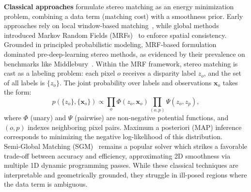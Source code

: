 \noindent\textbf{Classical approaches} formulate stereo matching as an energy minimization problem, combining a data term (matching cost) with a smoothness prior.
Early approaches rely on local window-based matching~\cite{scharstein2002taxonomy}, while global methods introduced Markov Random Fields (MRFs)~\cite{szeliski2008comparative} to enforce spatial consistency.
Grounded in principled probabilistic modeling, MRF-based formulation dominated pre-deep-learning stereo methods, as evidenced by their prevalence on benchmarks like Middlebury~\cite{scharstein2002taxonomy}.
Within the MRF framework, stereo matching is cast as a labeling problem: each pixel $o$ receives a disparity label $z_o$, and the set of all labels is $\{z_o\}$. The joint probability over labels and observations ${\mathbf{x}_o}$ takes the form:
\begin{equation}
	p(\{z_o\},\{\mathbf{x}_o\})\propto \prod_o \Phi(z_o,\mathbf{x}_o) \prod_{(o,p)} \Psi(z_o,z_p),
	\label{eq:mrf-tra}
\end{equation}
where $\Phi$ (unary) and $\Psi$ (pairwise) are non‑negative potential functions, and $(o,p)$ indexes neighboring pixel pairs.
Maximum a posteriori (MAP) inference corresponds to minimizing the negative log-likelihood of this distribution.
Semi‑Global Matching (SGM)~\cite{hirschmuller2007stereo} remains a popular solver which strikes a favorable trade-off between accuracy and efficiency, approximating 2D smoothness via multiple 1D dynamic programming passes.
While these classical techniques are interpretable and geometrically grounded, they struggle in ill-posed regions where the data term is ambiguous.

